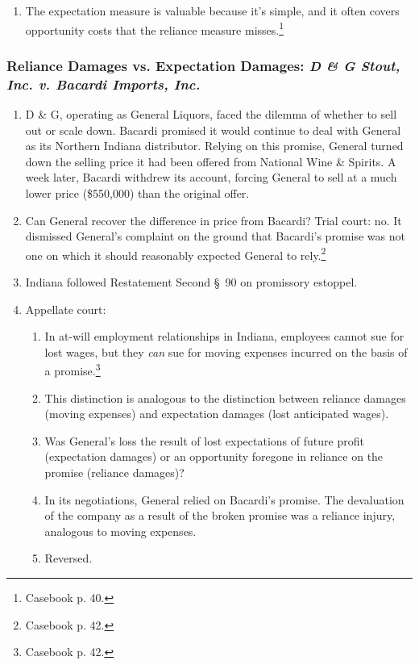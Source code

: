 \begin{enumerate}
    \item The expectation measure is valuable because it's simple, and it 
    often covers opportunity costs that the reliance measure 
    misses.\footnote{Casebook p. 40.}
\end{enumerate}

\subsubsection{Reliance Damages vs. Expectation Damages: \emph{D \& G Stout, 
Inc. v. Bacardi Imports, Inc.}}

\begin{enumerate}
    \item D \& G, operating as General Liquors, faced the dilemma of whether 
    to sell out or scale down. Bacardi promised it would continue to deal with 
    General as its Northern Indiana distributor. Relying on this promise, 
    General turned down the selling price it had been offered from National 
    Wine \& Spirits. A week later, Bacardi withdrew its account, forcing 
    General to sell at a much lower price (\$550,000) than the original offer.
    \item Can General recover the difference in price from Bacardi? Trial 
    court: no. It dismissed General's complaint on the ground that Bacardi's 
    promise was not one on which it should reasonably expected General to 
    rely.\footnote{Casebook p. 42.}
    \item Indiana followed Restatement Second \S\ 90 on promissory estoppel.
    \item Appellate court:
    \begin{enumerate}
        \item In at-will employment relationships in Indiana, employees cannot 
        sue for lost wages, but they \emph{can} sue for moving expenses 
        incurred on the basis of a promise.\footnote{Casebook p. 42.}
        \item This distinction is analogous to the distinction between 
        reliance damages (moving expenses) and expectation damages (lost 
        anticipated wages).
        \item Was General's loss the result of lost expectations of future 
        profit (expectation damages) or an opportunity foregone in reliance on 
        the promise (reliance damages)?
        \item In its negotiations, General relied on Bacardi's promise. The 
        devaluation of the company as a result of the broken promise was a 
        reliance injury, analogous to moving expenses.
        \item Reversed.
    \end{enumerate}
\end{enumerate}


